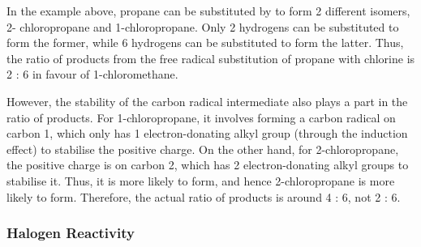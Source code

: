 


				In the example above, propane can be substituted by \ch{\Cl} to form 2 different isomers, 2- chloropropane and 1-chloropropane.
				Only 2 hydrogens can be substituted to form the former, while 6 hydrogens can be substituted to form the latter. Thus, the
				 ratio of products from the free radical substitution of propane with chlorine is 2 : 6 in
				favour of 1-chloromethane.

				However, the stability of the carbon radical intermediate also plays a part in the ratio of products. For 1-chloropropane,
				it involves forming a carbon radical on carbon 1, which only has 1 electron-donating alkyl group (through the induction effect)
				to stabilise the positive charge. On the other hand, for 2-chloropropane, the positive charge is on carbon 2, which
				has 2 electron-donating alkyl groups to stabilise it. Thus, it is more likely to form, and hence 2-chloropropane is more
				likely to form.	Therefore, the actual ratio of products is around 4 : 6, not 2 : 6.



			\subsubsection{Halogen Reactivity}

